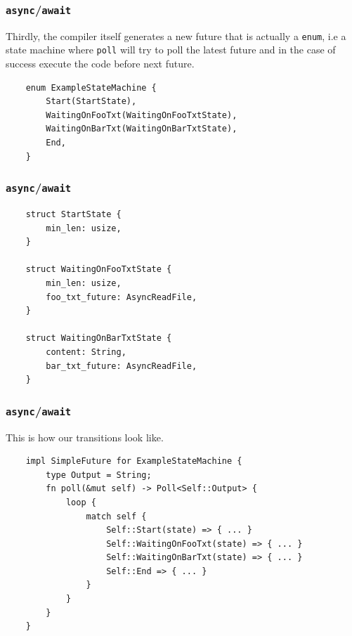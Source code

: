 \documentclass[aspectratio=1610,t]{beamer}
\begin{document}

\begin{frame}[fragile]
\frametitle{\texttt{async}/\texttt{await}}
Thirdly, the compiler itself generates a new future that is actually a \texttt{enum}, i.e a state machine where \texttt{poll} will try to poll the latest future and in the case of success execute the code before next future.

\begin{verbatim}
    enum ExampleStateMachine {
        Start(StartState),
        WaitingOnFooTxt(WaitingOnFooTxtState),
        WaitingOnBarTxt(WaitingOnBarTxtState),
        End,
    }
\end{verbatim}
\end{frame}


\begin{frame}[fragile]
\frametitle{\texttt{async}/\texttt{await}}
\begin{verbatim}
    struct StartState {
        min_len: usize,
    }

    struct WaitingOnFooTxtState {
        min_len: usize,
        foo_txt_future: AsyncReadFile,
    }

    struct WaitingOnBarTxtState {
        content: String,
        bar_txt_future: AsyncReadFile,
    }
\end{verbatim}
\end{frame}


\begin{frame}[fragile]
\frametitle{\texttt{async}/\texttt{await}}
This is how our transitions look like.

\begin{verbatim}
    impl SimpleFuture for ExampleStateMachine {
        type Output = String;
        fn poll(&mut self) -> Poll<Self::Output> {
            loop {
                match self {
                    Self::Start(state) => { ... }
                    Self::WaitingOnFooTxt(state) => { ... }
                    Self::WaitingOnBarTxt(state) => { ... }
                    Self::End => { ... }
                }
            }
        }
    }
\end{verbatim}
\end{frame}
\end{document}
